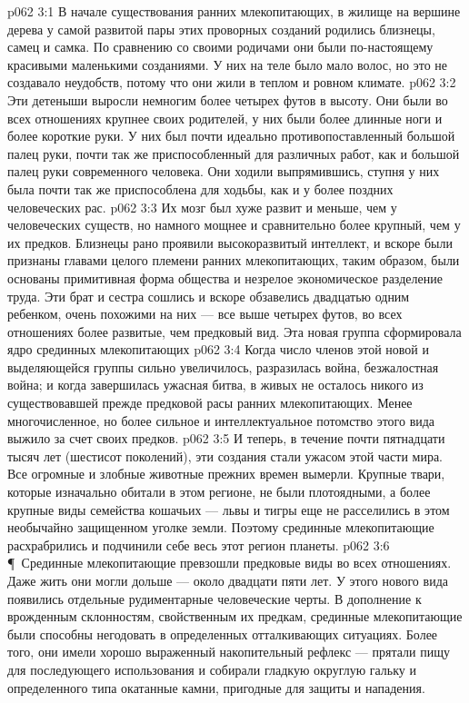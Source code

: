 \vs p062 3:1 В начале существования ранних млекопитающих, в жилище на вершине дерева у самой развитой пары этих проворных созданий родились близнецы, самец и самка. По сравнению со своими родичами они были по\hyp{}настоящему красивыми маленькими созданиями. У них на теле было мало волос, но это не создавало неудобств, потому что они жили в теплом и ровном климате.
\vs p062 3:2 Эти детеныши выросли немногим более четырех футов в высоту. Они были во всех отношениях крупнее своих родителей, у них были более длинные ноги и более короткие руки. У них был почти идеально противопоставленный большой палец руки, почти так же приспособленный для различных работ, как и большой палец руки современного человека. Они ходили выпрямившись, ступня у них была почти так же приспособлена для ходьбы, как и у более поздних человеческих рас.
\vs p062 3:3 Их мозг был хуже развит и меньше, чем у человеческих существ, но намного мощнее и сравнительно более крупный, чем у их предков. Близнецы рано проявили высокоразвитый интеллект, и вскоре были признаны главами целого племени ранних млекопитающих, таким образом, были основаны примитивная форма общества и незрелое экономическое разделение труда. Эти брат и сестра сошлись и вскоре обзавелись двадцатью одним ребенком, очень похожими на них --- все выше четырех футов, во всех отношениях более развитые, чем предковый вид. Эта новая группа сформировала ядро срединных млекопитающих
\vs p062 3:4 Когда число членов этой новой и выделяющейся группы сильно увеличилось, разразилась война, безжалостная война; и когда завершилась ужасная битва, в живых не осталось никого из существовавшей прежде предковой расы ранних млекопитающих. Менее многочисленное, но более сильное и интеллектуальное потомство этого вида выжило за счет своих предков.
\vs p062 3:5 И теперь, в течение почти пятнадцати тысяч лет (шестисот поколений), эти создания стали ужасом этой части мира. Все огромные и злобные животные прежних времен вымерли. Крупные твари, которые изначально обитали в этом регионе, не были плотоядными, а более крупные виды семейства кошачьих --- львы и тигры еще не расселились в этом необычайно защищенном уголке земли. Поэтому срединные млекопитающие расхрабрились и подчинили себе весь этот регион планеты.
\vs p062 3:6 \P\ Срединные млекопитающие превзошли предковые виды во всех отношениях. Даже жить они могли дольше --- около двадцати пяти лет. У этого нового вида появились отдельные рудиментарные человеческие черты. В дополнение к врожденным склонностям, свойственным их предкам, срединные млекопитающие были способны негодовать в определенных отталкивающих ситуациях. Более того, они имели хорошо выраженный накопительный рефлекс --- прятали пищу для последующего использования и собирали гладкую округлую гальку и определенного типа окатанные камни, пригодные для защиты и нападения.
